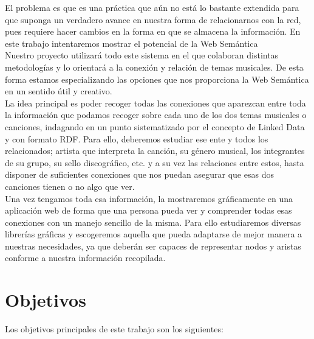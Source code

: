 El problema es que es una práctica que aún no está lo bastante extendida para que suponga un verdadero avance en nuestra forma de relacionarnos con la red, pues requiere hacer cambios en la forma en que se almacena la información. En este trabajo intentaremos mostrar el potencial de la Web Semántica\\

Nuestro proyecto utilizará todo este sistema en el que colaboran distintas metodologías y lo orientará a la conexión y relación de temas musicales. De esta forma estamos especializando las opciones que nos proporciona la Web Semántica en un sentido útil y creativo.\\

La idea principal es poder recoger todas las conexiones que aparezcan entre toda la información que podamos recoger sobre cada uno de los dos temas musicales o canciones, indagando en un punto sistematizado por el concepto de Linked Data y con formato RDF. Para ello, deberemos estudiar ese ente y todos los relacionados; artista que interpreta la canción, su género musical, los integrantes de su grupo, su sello discográfico, etc. y a su vez las relaciones entre estos, hasta disponer de suficientes conexiones que nos puedan asegurar que esas dos canciones tienen o no algo que ver.\\

Una vez tengamos toda esa información, la mostraremos gráficamente en una aplicación web de forma que una persona pueda ver y comprender todas esas conexiones con un manejo sencillo de la misma. Para ello estudiaremos diversas librerías gráficas y escogeremos aquella que pueda adaptarse de mejor manera a nuestras necesidades, ya que deberán ser capaces de representar nodos y aristas conforme a nuestra información recopilada.\\

\section{Objetivos}

Los objetivos principales de este trabajo son los siguientes:\\

